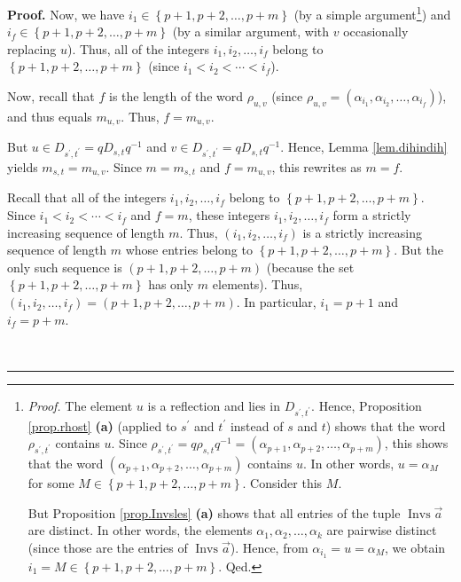 \documentclass
[numbers=enddot,12pt,final,onecolumn,notitlepage,abstracton]{scrartcl}%
\theoremstyle{definition}
\newenvironment{proof}[1][Proof]{\noindent\textbf{#1.} }{\ \rule{0.5em}{0.5em}}
\begin{document}
\begin{proof}
Now, we have $i_{1}\in\left\{  p+1,p+2,\ldots,p+m\right\}  $ (by a simple
argument\footnote{\textit{Proof.} The element $u$ is a reflection and lies in
$D_{s^{\prime},t^{\prime}}$. Hence, Proposition \ref{prop.rhost} \textbf{(a)}
(applied to $s^{\prime}$ and $t^{\prime}$ instead of $s$ and $t$) shows that
the word $\rho_{s^{\prime},t^{\prime}}$ contains $u$. Since $\rho_{s^{\prime
},t^{\prime}}=q\rho_{s,t}q^{-1}=\left(  \alpha_{p+1},\alpha_{p+2}%
,\ldots,\alpha_{p+m}\right)  $, this shows that the word $\left(  \alpha
_{p+1},\alpha_{p+2},\ldots,\alpha_{p+m}\right)  $ contains $u$. In other
words, $u=\alpha_{M}$ for some $M\in\left\{  p+1,p+2,\ldots,p+m\right\}  $.
Consider this $M$.
\par
But Proposition \ref{prop.Invsles} \textbf{(a)} shows that all entries of the
tuple $\operatorname*{Invs}\overrightarrow{a}$ are distinct. In other words,
the elements $\alpha_{1},\alpha_{2},\ldots,\alpha_{k}$ are pairwise distinct
(since those are the entries of $\operatorname*{Invs}\overrightarrow{a}$).
Hence, from $\alpha_{i_{1}}=u=\alpha_{M}$, we obtain $i_{1}=M\in\left\{
p+1,p+2,\ldots,p+m\right\}  $. Qed.}) and $i_{f}\in\left\{  p+1,p+2,\ldots
,p+m\right\}  $ (by a similar argument, with $v$ occasionally replacing $u$).
Thus, all of the integers $i_{1},i_{2},\ldots,i_{f}$ belong to $\left\{
p+1,p+2,\ldots,p+m\right\}  $ (since $i_{1}<i_{2}<\cdots<i_{f}$).

Now, recall that $f$ is the length of the word $\rho_{u,v}$ (since $\rho
_{u,v}=\left(  \alpha_{i_{1}},\alpha_{i_{2}},\ldots,\alpha_{i_{f}}\right)  $),
and thus equals $m_{u,v}$. Thus, $f=m_{u,v}$.

But $u\in D_{s^{\prime},t^{\prime}}=qD_{s,t}q^{-1}$ and $v\in D_{s^{\prime
},t^{\prime}}=qD_{s,t}q^{-1}$. Hence, Lemma \ref{lem.dihindih} yields
$m_{s,t}=m_{u,v}$. Since $m=m_{s,t}$ and $f=m_{u,v}$, this rewrites as $m=f$.

Recall that all of the integers $i_{1},i_{2},\ldots,i_{f}$ belong to $\left\{
p+1,p+2,\ldots,p+m\right\}  $. Since $i_{1}<i_{2}<\cdots<i_{f}$ and $f=m$,
these integers $i_{1},i_{2},\ldots,i_{f}$ form a strictly increasing sequence
of length $m$. Thus, $\left(  i_{1},i_{2},\ldots,i_{f}\right)  $ is a strictly
increasing sequence of length $m$ whose entries belong to $\left\{
p+1,p+2,\ldots,p+m\right\}  $. But the only such sequence is $\left(
p+1,p+2,\ldots,p+m\right)  $ (because the set $\left\{  p+1,p+2,\ldots
,p+m\right\}  $ has only $m$ elements). Thus, $\left(  i_{1},i_{2}%
,\ldots,i_{f}\right)  =\left(  p+1,p+2,\ldots,p+m\right)  $. In particular,
$i_{1}=p+1$ and $i_{f}=p+m$.


\end{proof}
\end{document}
